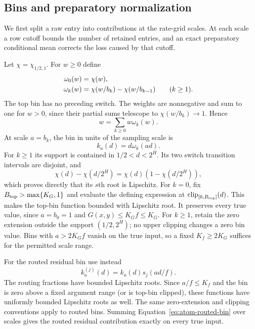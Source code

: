 \subsection{Bins and preparatory normalization}

We first split a raw entry into contributions at the rate-grid scales.
At each scale a row cutoff bounds the number of retained entries, and an
exact preparatory conditional mean corrects the loss caused by that cutoff.

Let $\chi=\chi_{1/2,1}$.  For $w\ge0$ define
\begin{align}
 \omega_0(w)&=\chi(w),\notag\\
 \omega_k(w)&=\chi(w/b_k)-\chi(w/b_{k-1})\qquad(k\ge1).
 \label{eq:atom-bin-weights}
\end{align}
The top bin has no preceding switch.  The weights are nonnegative and
sum to one for $w>0$, since their partial sums telescope to
$\chi(w/b_k)\to1$.  Hence
\begin{equation}
 w=\sum_{k\ge0}w\omega_k(w).
 \label{eq:atom-bin-partition}
\end{equation}
At scale $a=b_k$, the bin in units of the sampling scale is
\begin{equation}
 k_a(d)=d\omega_k(ad).
 \label{eq:atom-bin-function}
\end{equation}
For $k\ge1$ its support is contained in $1/2<d<2^H$.
Its two switch transition intervals are disjoint, and
\[
 \chi(d)-\chi(d/2^H)=\chi(d)(1-\chi(d/2^H)),
\]
which proves directly that its $s$th root is Lipschitz.
For $k=0$, fix $B_{\rm top}>\max\{K_G,1\}$ and evaluate the defining
expression at $\operatorname{clip}_{[0,B_{\rm top}]}(d)$.
This makes the top-bin function bounded with Lipschitz root.  It
preserves every true value, since $a=b_0=1$ and
$G(x,y)\le K_G f\le K_G$.  For $k\ge1$, retain the zero extension
outside the support $(1/2,2^H)$; no upper clipping changes a zero bin
value.  Bins with $a>2K_G f$ vanish on the true input, so a fixed
$K_f\ge2K_G$ suffices for the permitted scale range.

For the routed residual bin use instead
\begin{equation}
 k_a^{(j)}(d)=k_a(d)s_j(ad/f).
 \label{eq:atom-routed-bin}
\end{equation}
The routing fractions have bounded Lipschitz roots.  Since $a/f\le K_f$
and the bin is zero above a fixed argument range (or is top-bin clipped),
these functions have uniformly bounded Lipschitz roots as well.  The
same zero-extension and clipping conventions apply to routed bins.
Summing Equation~\eqref{eq:atom-routed-bin} over scales gives the routed
residual contribution exactly on every true input.

